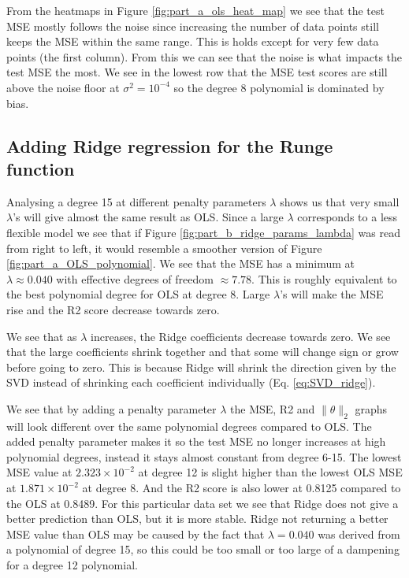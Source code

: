 \documentclass[reprint,english,notitlepage]{revtex4-2}  %
\begin{document}
From the heatmaps in Figure \ref{fig:part_a_ols_heat_map} we see that the test MSE mostly follows the noise since increasing the number of data points still keeps the MSE within the same range. This is holds except for very few data points (the first column). From this we can see that the noise is what impacts the test MSE the most. We see in the lowest row that the MSE test scores are still above the noise floor at $\sigma^2 = 10^{-4}$ so the degree 8 polynomial is dominated by bias. 


\subsection{Adding Ridge regression for the Runge function}%

Analysing a degree 15 at different penalty parameters $\lambda$ shows us that very small $\lambda$'s will give almost the same result as OLS. 
Since a large $\lambda$ corresponds to a less flexible model we see that if Figure \ref{fig:part_b_ridge_params_lambda} was read from right to left, it would resemble a smoother version of Figure \ref{fig:part_a_OLS_polynomial}.  We see that the MSE has a minimum at $\lambda \approx 0.040$ with effective degrees of freedom $\approx7.78$. This is roughly equivalent to the best polynomial degree for OLS at degree 8. Large $\lambda$'s will make the MSE rise and the R2 score decrease towards zero. 

We see that as $\lambda$ increases, the Ridge coefficients decrease towards zero. We see that the large coefficients shrink together and that some will change sign or grow before going to zero. This is because Ridge will shrink the direction given by the SVD instead of shrinking each coefficient individually (Eq. \ref{eq:SVD_ridge}). 

We see that by adding a penalty parameter $\lambda$ the MSE, R2 and $\|\theta\|_2$ graphs will look different over the same polynomial degrees compared to OLS. The added penalty parameter makes it so the test MSE no longer increases at high polynomial degrees, instead it stays almost constant from degree 6-15. The lowest MSE value at $2.323  \times 10^{-2}$ at degree 12 is slight higher than the lowest OLS MSE at $1.871 \times 10^{-2}$ at degree 8. And the R2 score is also lower at 0.8125 compared to the OLS at 0.8489. For this particular data set we see that Ridge does not give a better prediction than OLS, but it is more stable. Ridge not returning a better MSE value than OLS may be caused by the fact that $\lambda = 0.040$ was derived from a polynomial of degree 15, so this could be too small or too large of a dampening for a degree 12 polynomial.
\end{document}
